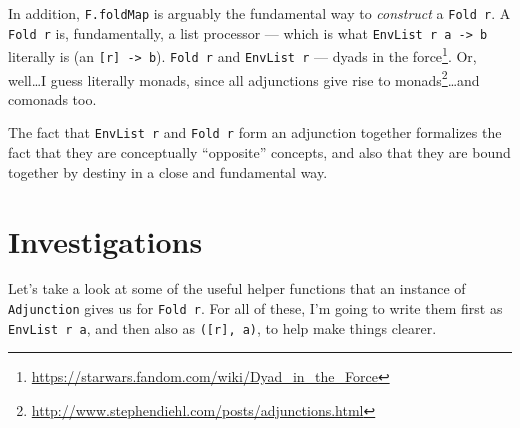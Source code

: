 \documentclass[]{article}
\renewcommand{\href}[2]{#2\footnote{\url{#1}}}
\begin{document}
In addition, \texttt{F.foldMap} is arguably the fundamental way to
\emph{construct} a \texttt{Fold\ r}. A \texttt{Fold\ r} is, fundamentally, a
list processor --- which is what \texttt{EnvList\ r\ a\ -\textgreater{}\ b}
literally is (an \texttt{{[}r{]}\ -\textgreater{}\ b}). \texttt{Fold\ r} and
\texttt{EnvList\ r} ---
\href{https://starwars.fandom.com/wiki/Dyad_in_the_Force}{dyads in the force}.
Or, well\ldots I guess literally monads, since
\href{http://www.stephendiehl.com/posts/adjunctions.html}{all adjunctions give
rise to monads}\ldots and comonads too.

The fact that \texttt{EnvList\ r} and \texttt{Fold\ r} form an adjunction
together formalizes the fact that they are conceptually ``opposite'' concepts,
and also that they are bound together by destiny in a close and fundamental way.

\hypertarget{investigations}{%
\section{Investigations}\label{investigations}}

Let's take a look at some of the useful helper functions that an instance of
\texttt{Adjunction} gives us for \texttt{Fold\ r}. For all of these, I'm going
to write them first as \texttt{EnvList\ r\ a}, and then also as
\texttt{({[}r{]},\ a)}, to help make things clearer.
\end{document}
